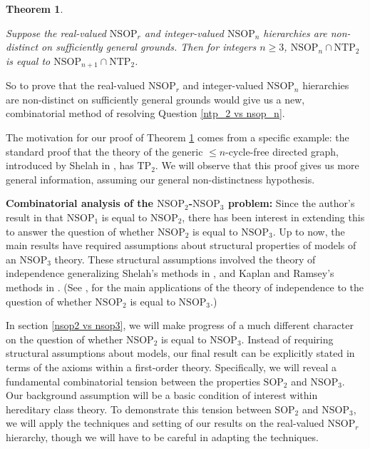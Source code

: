 \documentclass{amsart}
\newtheorem{theorem}{Theorem}[section]
\theoremstyle{definition}
\theoremstyle{remark}
\numberwithin{equation}{section}
\begin{document}
\begin{theorem}\label{main theorem 2}

Suppose the real-valued $\mathrm{NSOP}_{r}$ and integer-valued $\mathrm{NSOP}_{n}$ hierarchies are non-distinct on sufficiently general grounds. Then for integers $n \geq 3$, $\mathrm{NSOP}_{n} \cap \mathrm{NTP}_{2}$ is equal to $\mathrm{NSOP}_{n+1} \cap \mathrm{NTP}_{2}$.

\end{theorem}



So to prove that the real-valued $\mathrm{NSOP}_{r}$ and integer-valued $\mathrm{NSOP}_{n}$ hierarchies are non-distinct on sufficiently general grounds would give us a new, combinatorial method of resolving Question \ref{ntp_2 vs nsop_n}. 


The motivation for our proof of Theorem \ref{main theorem 2} comes from a specific example: the standard proof that the theory of the generic $\leq n$-cycle-free directed graph, introduced by Shelah in \cite{She95}, has $\mathrm{TP}_{2}$. We will observe that this proof gives us more general information, assuming our general non-distinctness hypothesis. 

\:

\textbf{Combinatorial analysis of the $\mathrm{NSOP}_{2}$-$\mathrm{NSOP}_{3}$ problem:} Since the author's result in \cite{NSOP2} that $\mathrm{NSOP}_{1}$ is equal to $\mathrm{NSOP}_{2}$, there has been interest in extending this to answer the question of whether $\mathrm{NSOP}_{2}$ is equal to $\mathrm{NSOP}_{3}$. Up to now, the main results have required assumptions about structural properties of models of an $\mathrm{NSOP}_{3}$ theory. These structural assumptions involved the theory of independence generalizing Shelah's methods in \cite{Sh90}, and Kaplan and Ramsey's methods in \cite{KR17}. (See \cite{GFA}, \cite{INDNSOP3} for the main applications of the theory of independence to the question of whether $\mathrm{NSOP}_{2}$ is equal to $\mathrm{NSOP}_{3}$.)

In section \ref{nsop2 vs nsop3}, we will make progress of a much different character on the question of whether $\mathrm{NSOP}_{2}$ is equal to $\mathrm{NSOP}_{3}$. Instead of requiring structural assumptions about models, our final result can be explicitly stated in terms of the axioms within a first-order theory. Specifically, we will reveal a fundamental combinatorial tension between the properties $\mathrm{SOP}_{2}$ and $\mathrm{NSOP}_{3}$. Our background assumption will be a basic condition of interest within hereditary class theory. To demonstrate this tension between $\mathrm{SOP}_2$ and $\mathrm{NSOP}_3$, we will apply the techniques and setting of our results on the real-valued $\mathrm{NSOP}_{r}$ hierarchy, though we will have to be careful in adapting the techniques.
\end{document}
